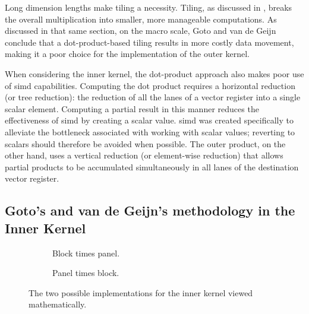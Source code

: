 \documentclass[\main/thesis.tex]{subfiles}
\begin{document}
Long dimension lengths make tiling a necessity.
Tiling, as discussed in , breaks the overall multiplication into smaller, more manageable computations.
As discussed in that same section, on the macro scale, Goto and van de Geijn conclude that a dot-product-based tiling results in more costly data movement, making it a poor choice for the implementation of the outer kernel.

When considering the inner kernel, the dot-product approach also makes poor use of \gls{simd} capabilities.
Computing the dot product requires a horizontal reduction (or tree reduction): the reduction of all the \glspl{lane} of a vector register into a single scalar element.
Computing a partial result in this manner reduces the effectiveness of \gls{simd} by creating a scalar value.
\Gls{simd} was created specifically to alleviate the bottleneck associated with working with scalar values; reverting to scalars should therefore be avoided when possible.
The outer product, on the other hand, uses a vertical reduction (or element-wise reduction) that allows partial products to be accumulated simultaneously in all \glspl{lane} of the destination vector register.

\subsection{Goto's and van de Geijn's  methodology in the Inner Kernel}
\label{sec:gotoInner}

\begin{figure}[t]
  \hfill
  \begin{subfigure}{.45\linewidth}
    \centering
    \caption{Block times panel.}
    \label{fig:gebpMath}
  \end{subfigure}
  \hfill
  \begin{subfigure}{.45\linewidth}
    \centering
    \caption{Panel times block.}
    \label{fig:gepbMath}
  \end{subfigure}
  \hfill
  \caption[Inner kernel impelmentations viewed mathematically]{The two possible implementations for the inner kernel viewed mathematically.}
  \label{fig:gebp}
\end{figure}
\end{document}

